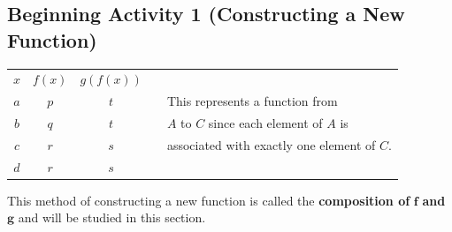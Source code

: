 \documentclass[11pt]{article}
\begin{document}


\subsection*{Beginning Activity 1 (Constructing a New Function)}
\begin{tabular}[t]{| c | c | c | p{0.5in}  l} \cline{1-3}
$x$  &  $f\left( x \right)$  &  $g\left( {f\left( x \right)} \right)$ \\ \cline{1-3}
$a$  &  $p$  &  $t$  & & This represents a function from \\ \cline{1-3}
$b$  &  $q$  &  $t$  & & $A$  to  $C$ since each element of  $A$  is\\ \cline{1-3}
$c$  &  $r$  &  $s$  & & associated with exactly one element of  $C$. \\ \cline{1-3}
$d$  &  $r$  &  $s$  & \\ \cline{1-3}
\end{tabular}

\eighth
\noindent
This method of constructing a new function is called the \textbf{composition of} $\boldsymbol{f}$ \textbf{and} $\boldsymbol{g}$ and will be studied in this section.
\hbreak



\newpage
\end{document}
